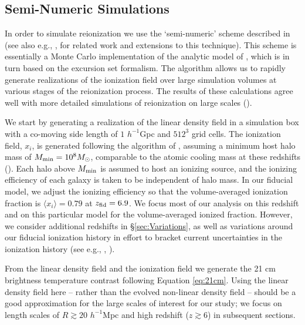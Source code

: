 \subsection{Semi-Numeric Simulations} \label{sec:sims}

In order to simulate reionization we use the `semi-numeric' scheme described in 
\cite{Zahn:2006sg} (see also e.g., \citealt{Mesinger:2010ne}, for related work and extensions to this technique). This scheme is essentially a Monte Carlo implementation
of the analytic model of \cite{Furlanetto:2004nh}, which is in turn based
on the excursion set formalism. The \cite{Zahn:2006sg} algorithm allows us to rapidly generate
realizations of the ionization field over large simulation volumes at various
stages of the reionization process. The results of these calculations agree well with
more detailed simulations of reionization on large scales (\citealt{Zahn:2006sg,Zahn:2010yw}). 

We start by generating a realization of the linear density field in a simulation
box with a co-moving side length of $1$ $h^{-1}$Gpc and $512^3$ grid cells. The
ionization field, $x_i$, is generated following the algorithm of \cite{Zahn:2006sg},
assuming a minimum host halo mass of $M_{\rm min} = 10^8 M_\odot$, comparable
to the atomic cooling mass at these redshifts (\citealt{Barkana:2000fd}). Each halo above $M_{\rm min}$
is assumed to host an ionizing source, and the ionizing efficiency of each galaxy is taken to be 
independent of halo mass. In our fiducial model, we adjust the ionizing efficiency
so that the volume-averaged ionization fraction is $\langle x_i \rangle = 0.79$ at
$z_{\rm fid} = 6.9$. We focus most of our analysis on this redshift and on this
particular model for the volume-averaged ionized fraction. However, we consider additional 
redshifts in \S\ref{sec:Variations}, as well as variations around our fiducial
ionization history in effort to bracket current uncertainties in the ionization history (see 
e.g., \citealt{Kuhlen:2012vy}, \citealt{Zahn:2011vp}).

From the linear density field
and the ionization field we generate the 21 cm brightness temperature
contrast following Equation \ref{eq:21cm}.  Using the linear density field here -- rather
than the evolved non-linear density field -- should be a good approximation for the large
scales of interest for our study; we focus on length scales of $R \gtrsim 20$ $h^{-1}$Mpc and high redshift ($z \gtrsim 6$) 
in subsequent sections. 


